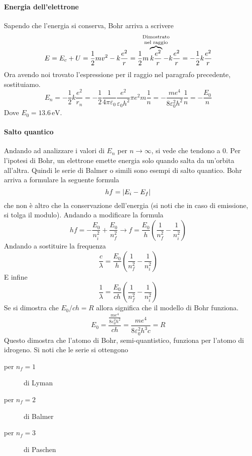 \paragraph{Energia dell'elettrone}
Sapendo che l'energia si conserva, Bohr arriva a scrivere
\begin{equation*}
  E = E_c + U = \frac{1}{2}mv^2-k \frac{e^2}{r} = 
  \frac{1}{2}m\overbrace{k\frac{e^2}{r}}^{\mathclap{\text{\parbox{4cm}{\centering Dimostrato \\[-4pt]
  nel raggio}}}}-k \frac{e^2}{r} = -\frac{1}{2}k \frac{e^2}{r}
\end{equation*}
Ora avendo noi trovato l'espressione per il raggio nel paragrafo precedente, sostituiamo.
\begin{equation*}
  E_n=-\frac{1}{2}k \frac{e^2}{r_n}=-\frac{1}{2}\frac{1}{4\pi\varepsilon_0}
  \frac{e^2}{\varepsilon_0h^2}\pi e^2m\frac{1}{n}=
  -\frac{me^4}{8\varepsilon_0^2h^2}\frac{1}{n}= -\frac{E_0}{n}
\end{equation*}
Dove $E_0 = 13.6\,\text{eV}$.\\
\paragraph{Salto quantico}
Andando ad analizzare i valori di $E_n$ per $n\to\infty$, si vede che tendono a $0$. Per l'ipotesi
di Bohr, un elettrone emette energia solo quando salta da un'orbita all'altra. Quindi le serie
di Balmer o simili sono esempi di salto quantico. Bohr arriva a formulare la seguente formula
\begin{equation*}
  hf = \lvert E_i-E_f\rvert
\end{equation*}
che non è altro che la conservazione dell'energia (si noti che in caso di emissione, si tolga il
modulo). Andando a modificare la formula
\begin{equation*}
  hf=-\frac{E_0}{n_i^2}+\frac{E_0}{n_f^2} \rightarrow f = 
  \frac{E_0}{h}\left( \frac{1}{n_f^2}-\frac{1}{n_i^2} \right)
\end{equation*}
Andando a sostituire la frequenza
\begin{equation*}
  \frac{c}{\lambda}=\frac{E_0}{h}\left( \frac{1}{n_f^2}-\frac{1}{n_i^2} \right)
\end{equation*}
E infine
\begin{equation*}
  \frac{1}{\lambda}=\frac{E_0}{ch}\left( \frac{1}{n_f^2}-\frac{1}{n_i^2} \right)
\end{equation*}
Se si dimostra che $E_0/ch = R$ allora significa che il modello di Bohr funziona.
\begin{equation*}
  E_0= \frac{\frac{me^4}{8\varepsilon_0^2h^2}}{ch}= \frac{me^4}{8\varepsilon_0^2h^3c}=R
\end{equation*}
Questo dimostra che l'atomo di Bohr, semi-quantistico, funziona per l'atomo di idrogeno. Si noti che
le serie si ottengono
\begin{description}
  \item[per $n_f=1$] di Lyman
  \item[per $n_f=2$] di Balmer
  \item[per $n_f=3$] di Paschen
\end{description}
